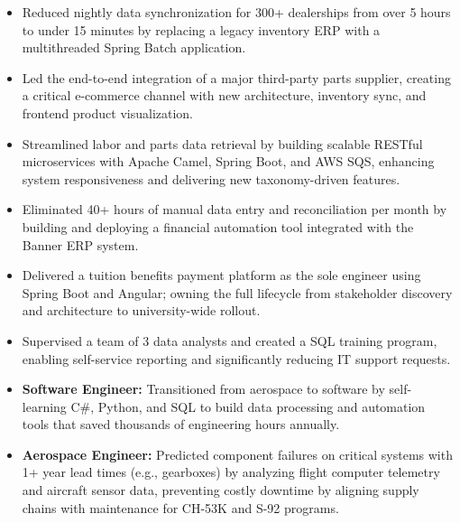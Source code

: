 \begin{itemize}[leftmargin=*]
    \item Reduced nightly data synchronization for 300+ dealerships from over 5 hours to under 15 minutes by replacing a legacy inventory ERP with a multithreaded Spring Batch application.
    \item Led the end-to-end integration of a major third-party parts supplier, creating a critical e-commerce channel with new architecture, inventory sync, and frontend product visualization.
    \item Streamlined labor and parts data retrieval by building scalable RESTful microservices with Apache Camel, Spring Boot, and AWS SQS, enhancing system responsiveness and delivering new taxonomy-driven features.
\end{itemize}
\vspace{\jobGroupBottomMargin}

\begin{itemize}[leftmargin=*]
    \item Eliminated 40+ hours of manual data entry and reconciliation per month by building and deploying a financial automation tool integrated with the Banner ERP system.
    \item Delivered a tuition benefits payment platform as the sole engineer using Spring Boot and Angular; owning the full lifecycle from stakeholder discovery and architecture to university-wide rollout.
    \item Supervised a team of 3 data analysts and created a SQL training program, enabling self-service reporting and significantly reducing IT support requests.
\end{itemize}
\vspace{\jobGroupBottomMargin}

\begin{itemize}[leftmargin=*]
    \item \textbf{Software Engineer:} Transitioned from aerospace to software by self-learning C\#, Python, and SQL to build data processing and automation tools that saved thousands of engineering hours annually.
    \item \textbf{Aerospace Engineer:} Predicted component failures on critical systems with 1+ year lead times (e.g., gearboxes) by analyzing flight computer telemetry and aircraft sensor data, preventing costly downtime by aligning supply chains with maintenance for CH-53K and S-92 programs.
\end{itemize}

